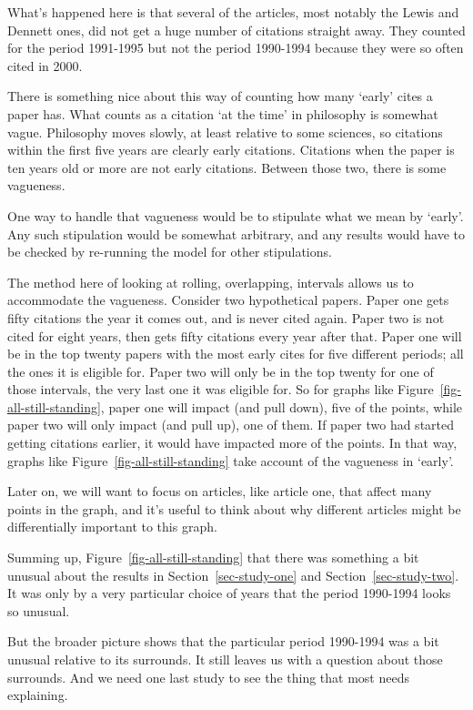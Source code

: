 \documentclass[
  10pt,
  letterpaper,
  DIV=11,
  numbers=noendperiod,
  twoside]{scrartcl}
\begin{document}
What's happened here is that several of the articles, most notably the
Lewis and Dennett ones, did not get a huge number of citations straight
away. They counted for the period 1991-1995 but not the period 1990-1994
because they were so often cited in 2000.

There is something nice about this way of counting how many `early'
cites a paper has. What counts as a citation `at the time' in philosophy
is somewhat vague. Philosophy moves slowly, at least relative to some
sciences, so citations within the first five years are clearly early
citations. Citations when the paper is ten years old or more are not
early citations. Between those two, there is some vagueness.

One way to handle that vagueness would be to stipulate what we mean by
`early'. Any such stipulation would be somewhat arbitrary, and any
results would have to be checked by re-running the model for other
stipulations.

The method here of looking at rolling, overlapping, intervals allows us
to accommodate the vagueness. Consider two hypothetical papers. Paper
one gets fifty citations the year it comes out, and is never cited
again. Paper two is not cited for eight years, then gets fifty citations
every year after that. Paper one will be in the top twenty papers with
the most early cites for five different periods; all the ones it is
eligible for. Paper two will only be in the top twenty for one of those
intervals, the very last one it was eligible for. So for graphs like
Figure~\ref{fig-all-still-standing}, paper one will impact (and pull
down), five of the points, while paper two will only impact (and pull
up), one of them. If paper two had started getting citations earlier, it
would have impacted more of the points. In that way, graphs like
Figure~\ref{fig-all-still-standing} take account of the vagueness in
`early'.

Later on, we will want to focus on articles, like article one, that
affect many points in the graph, and it's useful to think about why
different articles might be differentially important to this graph.

Summing up, Figure~\ref{fig-all-still-standing} that there was something
a bit unusual about the results in Section~\ref{sec-study-one} and
Section~\ref{sec-study-two}. It was only by a very particular choice of
years that the period 1990-1994 looks so unusual.

But the broader picture shows that the particular period 1990-1994 was a
bit unusual relative to its surrounds. It still leaves us with a
question about those surrounds. And we need one last study to see the
thing that most needs explaining.
\end{document}
